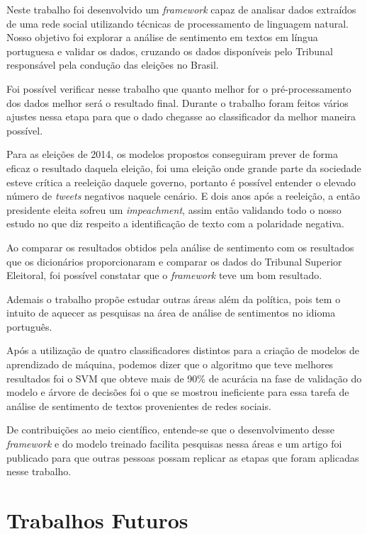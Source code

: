 Neste trabalho foi desenvolvido um \textit{framework} capaz de
analisar dados extraídos de uma rede social utilizando técnicas
de processamento de linguagem natural. Nosso objetivo foi
explorar a análise de sentimento em textos em língua portuguesa e
validar os dados, cruzando os dados disponíveis pelo Tribunal
responsável pela condução das eleições no Brasil.


Foi possível verificar nesse trabalho que quanto melhor for o pré-processamento dos 
dados melhor será o resultado final. Durante o trabalho foram feitos vários ajustes nessa
etapa para que o dado chegasse ao classificador da melhor maneira possível.

Para as eleições de 2014, os modelos propostos conseguiram prever de forma eficaz o resultado 
daquela eleição, foi uma eleição onde grande parte da sociedade esteve crítica a reeleição daquele governo,
portanto é possível entender o elevado número de \textit{tweets} negativos naquele cenário. E dois anos após a 
reeleição, a então presidente eleita sofreu um \textit{impeachment}, assim então validando todo o nosso estudo 
no que diz respeito a identificação de texto com a polaridade negativa.

Ao comparar os resultados obtidos pela análise de sentimento
com os resultados que os dicionários proporcionaram e comparar os dados do Tribunal
Superior Eleitoral, foi possível constatar que o \textit{framework} teve
um bom resultado.

Ademais o trabalho propõe estudar outras áreas além da política, pois tem o intuito de aquecer 
as pesquisas na área de análise de sentimentos no idioma português. 

Após a utilização de quatro classificadores distintos para a criação de modelos de aprendizado de máquina,
podemos dizer que o algoritmo que teve melhores resultados foi o \acrshort{SVM} que obteve mais de 90\% de acurácia
na fase de validação do modelo e árvore de decisões foi o que se mostrou ineficiente para essa tarefa de 
análise de sentimento de textos provenientes de redes sociais.


De contribuições ao meio científico, entende-se que o desenvolvimento desse \textit{framework} e do modelo treinado facilita
pesquisas nessa áreas e um artigo foi publicado para que outras pessoas possam replicar as etapas que foram aplicadas nesse trabalho.

\section{Trabalhos Futuros}
